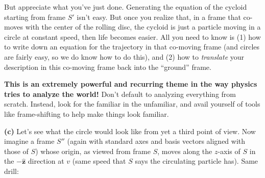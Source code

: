 \documentclass[12pt]{article}
\newcommand{\unz}{\hat{\mathbf{z}}}
\begin{document}
But appreciate what you’ve just done. Generating the equation of the cycloid starting from frame \(S'\) isn’t easy. But once you realize that, in a frame that co-moves with the center of the rolling disc, the cycloid is just a particle moving in a circle at constant speed, then life becomes easier. All you need to know is (1) how to write down an equation for the trajectory in that co-moving frame (and circles are fairly easy, so we do know how to do this), and (2) how to \textit{translate} your description in this co-moving frame back into the “ground” frame.

\textbf{This is an extremely powerful and recurring theme in the way physics tries to analyze the world!} Don’t default to analyzing everything from scratch. Instead, look for the familiar in the unfamiliar, and avail yourself of tools like frame-shifting to help make things look familiar.

\textbf{(c)} Let’s see what the circle would look like from yet a third point of view. Now imagine a frame \(S''\) (again with standard axes and basis vectors aligned with those of \(S\)) whose origin, as viewed from frame \(S\), moves along the \(z\)-axis of \(S\) in the \(-\unz\) direction at \(v\) (same speed that \(S\) says the circulating particle has). Same drill:
\end{document}
